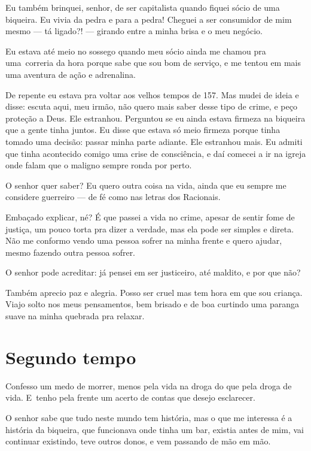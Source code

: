 Eu também brinquei, senhor, de ser capitalista quando fiquei sócio de
uma biqueira. Eu vivia da pedra e para a pedra! Cheguei a ser consumidor
de mim mesmo --- tá ligado?! --- girando entre a minha brisa e o meu
negócio.

Eu estava até meio no sossego quando meu sócio ainda me chamou pra uma~correria 
da hora porque sabe que sou bom de serviço, e me tentou em mais
uma aventura de ação e adrenalina.

De repente eu estava pra voltar aos velhos tempos de 157. Mas mudei de
ideia e disse: escuta aqui, meu irmão, não quero mais saber desse tipo
de crime, e peço proteção a Deus. Ele estranhou. Perguntou se eu ainda
estava firmeza na biqueira que a gente tinha juntos. Eu disse que estava
só meio firmeza porque tinha tomado uma decisão: passar minha parte
adiante. Ele estranhou mais. Eu admiti que tinha acontecido comigo uma
crise de consciência, e daí comecei a ir na igreja onde falam que o
maligno sempre ronda por perto.

O senhor quer saber? Eu quero outra coisa na vida, ainda que eu sempre
me considere guerreiro --- de fé como nas letras dos Racionais.

Embaçado explicar, né? É que passei a vida no crime, apesar de sentir
fome de justiça, um pouco torta pra dizer a verdade, mas ela pode ser
simples e direta. Não me conformo vendo uma pessoa sofrer na minha
frente e quero ajudar, mesmo fazendo outra pessoa sofrer.

O senhor pode acreditar: já pensei em ser justiceiro, até maldito, e por
que não?

Também aprecio paz e alegria. Posso ser cruel mas tem hora em que sou
criança. Viajo solto nos meus pensamentos, bem brisado e de boa curtindo
uma paranga suave na minha quebrada pra relaxar.

 

\section{Segundo tempo}

 

Confesso um medo de morrer, menos pela vida na droga do que pela droga
de vida. E~tenho pela frente um acerto de contas que desejo esclarecer.

O senhor sabe que tudo neste mundo tem história, mas o que me interessa
é a história da biqueira, que funcionava onde tinha um bar, existia
antes de mim, vai continuar existindo, teve outros donos, e vem passando
de mão em mão.

